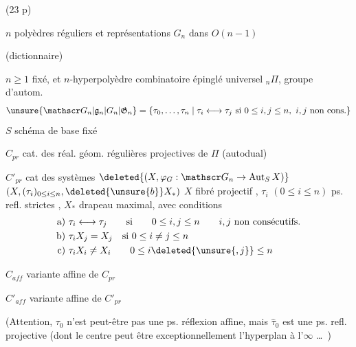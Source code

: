 (23 p)

$n$ polyèdres réguliers et représentations  $G_n$ dans $O(n-1)$ 

(dictionnaire)


$n\geqslant1$ fixé, et $n$-hyperpolyèdre combinatoire épinglé universel $ {}_n\Pi$, groupe d'autom.
\[
\unsure{\mathscr G_n|\mathfrak g_n|G_n|\mathfrak G_n}=\{\tau_0,\ldots,\tau_n\mid \tau_i\longleftrightarrow\tau_j\text{ si }0\leq i,j\leq n,\ i,j\text{ non cons.}\}
\]
$S$ schéma de base fixé

 $C_{pr}$ cat. des réal. géom. régulières  projectives de $\Pi$ (autodual)

 $C'_{pr}$ cat des systèmes $\deleted{(X,\varphi_G:\mathscr G_n\to\operatorname{Aut}_S X)}$ $(X,(\tau_i)_{0\leq i\leq n},\deleted{\unsure{b}}X_*)$ $X$ fibré projectif , $\tau_i$ $(0\leq i\leq n)$ ps. refl. strictes ,  $X_*$ drapeau maximal, avec conditions
\[
\begin{aligned}
\text{a)}\ &\tau_i\longleftrightarrow\tau_j\qquad\text{si}\qquad 0\leq i,j\leq n\qquad i,j\text{ non consécutifs.}\\
\text{b)}\ &\tau_i X_j=X_j\quad\text{si }0\leq i\ne j\leq n\\
\text{c)}\ &\tau_i X_i\ne X_i\qquad 0\leq i\deleted{\unsure{,j}}\leq n
\end{aligned}
\]

 $C_{aff}$ variante affine de $C_{pr}$

 $C'_{aff}$ variante affine de $C'_{pr}$ 

(Attention, $\tau_0$ n'est peut-être pas une ps. réflexion affine, mais $\widehat\tau_0$ est une ps. refl. projective (dont le  centre peut être exceptionnellement l'hyperplan à l'$\infty$ \ldots\ )


